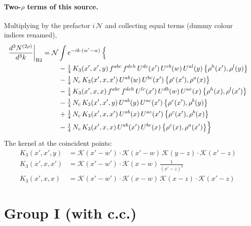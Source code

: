 \documentclass[10pt]{article}
\numberwithin{equation}{section}
\newcommand{\KK}{\mathcal K}
\newcommand{\NN}{\mathcal N}
\begin{document}
\paragraph{Two-$\rho$ terms of this source.} Multiplying by the prefactor $i\,\NN$ and collecting equal terms (dummy colour indices renamed),
\begin{align}
\frac{d^3N^{(2\rho)}}{d^3k}\bigg|_{\rm B2}={}&\NN\int e^{-ik\cdot(w'-w)}\,\Big\{\notag\\
&\quad -\tfrac14\,K_3(x',x',y)\,f^{abc}\,f^{deh}\,U^{dc}(x')\,U^{eb}(w)\,U^{al}(y)\,\big\{\rho^{h}(x'),\rho^{l}(y)\big\}\notag\\
&\quad -\tfrac14\,N_{c}\,K_3(x',x,x')\,U^{ab}(w)\,U^{bc}(x')\,\big\{\rho^{c}(x'),\rho^{a}(x)\big\}\notag\\
&\quad -\tfrac14\,K_3(x',x,x)\,f^{abc}\,f^{deh}\,U^{lc}(x')\,U^{db}(w)\,U^{ae}(x)\,\big\{\rho^{h}(x),\rho^{l}(x')\big\}\notag\\
&\quad -\tfrac14\,N_{c}\,K_3(x',x',y)\,U^{ab}(y)\,U^{ac}(x')\,\big\{\rho^{c}(x'),\rho^{b}(y)\big\}\notag\\
&\quad +\tfrac14\,N_{c}\,K_3(x',x,x')\,U^{ab}(x)\,U^{ac}(x')\,\big\{\rho^{c}(x'),\rho^{b}(x)\big\}\notag\\
&\quad -\tfrac14\,N_{c}\,K_3(x',x,x)\,U^{ab}(x')\,U^{bc}(x)\,\big\{\rho^{c}(x),\rho^{a}(x')\big\}\Big\}\label{R:eq:res-B2}
\end{align}
The kernel at the coincident points:
\begin{align*}
K_3(x',x',y)&=\KK(x'-w')\cdot\KK(x'-w)\,\KK(y-z)\cdot\KK(x'-z)\\K_3(x',x,x')&=\KK(x'-w')\cdot\KK(x-w)\,\frac{1}{(x'-z)^2}\\K_3(x',x,x)&=\KK(x'-w')\cdot\KK(x-w)\,\KK(x-z)\cdot\KK(x'-z)
\end{align*}

\section{Group I (with c.c.)}\label{R:sec:G1}
\end{document}
